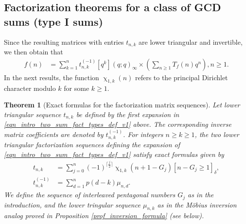 \documentclass[12pt,reqno,a4letter]{article}
\numberwithin{figure}{section}
\numberwithin{table}{section}
\numberwithin{equation}{section}
\newcommand{\Iverson}[1]{\ensuremath{\left[#1\right]_{\delta}}}
\renewcommand{\chi}{\upchi}
\theoremstyle{plain}
\newtheorem{theorem}{Theorem}
\numberwithin{theorem}{section}
\theoremstyle{definition}
\begin{document}
\subsection{Factorization theorems for a class of GCD sums (type I sums)}

Since the resulting matrices with entries $t_{n,k}$ are lower triangular and invertible, 
we then obtain that 
\begin{align} 
\label{eqn_intro_two_sum_fact_types_def_v3_invs}
f(n) & = \sum_{k=1}^n t_{n,k}^{(-1)} [q^k](q; q)_{\infty} \times \left(\sum_{n \geq 1} 
     T_f(n) q^n\right), n \geq 1.
\end{align}
In the next results, the function $\chi_{1,k}(n)$ 
refers to the principal Dirichlet character modulo $k$ for some $k \geq 1$.

\begin{theorem}[Exact formulas for the factorization matrix sequences] 
\label{theorem_snk_snkinv_seq_formulas_v1} 
Let lower triangular sequence $t_{n,k}$ be defined by the first expansion 
in \eqref{eqn_intro_two_sum_fact_types_def_v1} above. 
The corresponding inverse matrix coefficients are denoted by $t_{n,k}^{(-1)}$. 
For integers $n \geq k \geq 1$, the two lower triangular 
factorization sequences defining the expansion of 
\eqref{eqn_intro_two_sum_fact_types_def_v1} satisfy exact formulas given by 
\begin{align*} 
\tag{i} 
t_{n,k} & = \sum_{j=0}^{n} (-1)^{\lceil \frac{j}{2} \rceil} \chi_{1,k}(n+1-G_j) \Iverson{n-G_j \geq 1}, \\ 
\tag{ii} 
t_{n,k}^{(-1)} & = \sum_{d=1}^n p(d-k) \mu_{n,d}. 
\end{align*} 
We define the sequence of interleaved pentagonal numbers $G_j$ 
as in the introduction, and the lower tringular sequence $\mu_{n,k}$ as in 
the M\"obius inversion analog proved in 
Proposition \ref{prof_inversion_formula} (see below). 
\end{theorem}
\end{document}
